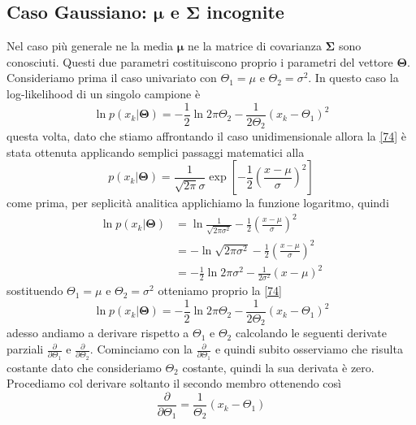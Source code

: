\subsection{Caso Gaussiano: $\mathbf{\mu}$ e $\mathbf{\Sigma}$ incognite }
Nel caso più generale ne la media $\mathbf{\mu}$ ne la matrice di covarianza $\mathbf{\Sigma}$ sono conosciuti. Questi due parametri costituiscono proprio i parametri del vettore $\mathbf{\Theta}$. Consideriamo prima il caso univariato con $\Theta_1 = \mu$ e $\Theta_2 =\sigma^2$. In questo caso la log-likelihood di un singolo campione è
\begin{equation}\label{74}
\ln p(x_k|\mathbf{\Theta}) = -\frac{1}{2}\ln 2\pi \Theta_2 - \frac{1}{2\Theta_2}(x_k-\Theta_1)^2
\end{equation}
questa volta, dato che stiamo affrontando il caso unidimensionale allora la \ref{74} è stata ottenuta applicando semplici passaggi matematici alla
\begin{equation}
p(x_k| \mathbf{\Theta}) = \frac{1}{\sqrt{2\pi} \sigma} \exp  \left [ -\frac{1}{2}  \left (  \frac{x - \mu}{\sigma} \right )^2 \right  ]
\end{equation}
come prima, per seplicità analitica applichiamo la funzione logaritmo, quindi
\begin{equation}
\begin{split}
\ln p(x_k| \mathbf{\Theta}) &= \ln \frac{1}{\sqrt{2\pi \sigma^2}} -\frac{1}{2}  \left (  \frac{x - \mu}{\sigma} \right )^2\\
&= - \ln \sqrt{2\pi \sigma^2} -\frac{1}{2}  \left (  \frac{x - \mu}{\sigma} \right )^2\\
&= - \frac{1}{2} \ln2 \pi \sigma^2 -\frac{1}{2\sigma^2}  \left ( x - \mu \right )^2
\end{split}
\end{equation}
sostituendo $\Theta_1 = \mu$ e $\Theta_2 =\sigma^2$ otteniamo proprio la \ref{74}
\begin{equation}\label{77}
\ln p(x_k|\mathbf{\Theta}) = -\frac{1}{2}\ln 2\pi \Theta_2 - \frac{1}{2\Theta_2}(x_k-\Theta_1)^2
\end{equation}
adesso andiamo a derivare rispetto a $\Theta_1$ e $\Theta_2$ calcolando le seguenti derivate parziali $\frac{\partial }{ \partial \Theta_1}$ e $\frac{\partial }{ \partial \Theta_2}$. Cominciamo con la $\frac{\partial }{ \partial \Theta_1}$ e quindi subito osserviamo che risulta costante dato che consideriamo $\Theta_2$ costante, quindi la sua derivata è zero. Procediamo col derivare soltanto il secondo membro ottenendo così
\begin{equation}
\frac{\partial }{ \partial \Theta_1} = \frac{1}{\Theta_2}(x_k - \Theta_1) 
\end{equation}
